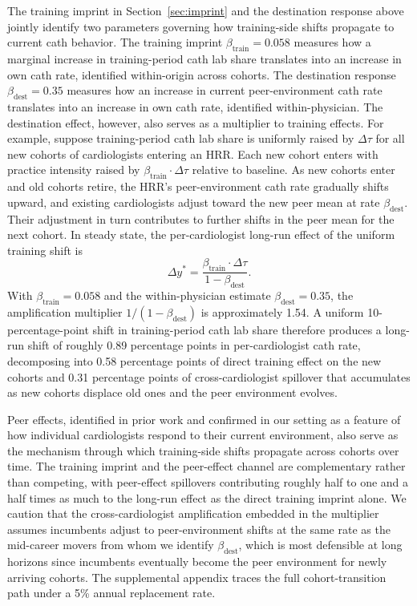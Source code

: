 \documentclass[12pt]{article}
\begin{document}
The training imprint in Section~\ref{sec:imprint} and the destination response above jointly identify two parameters governing how training-side shifts propagate to current cath behavior. The training imprint $\beta_{\text{train}} = 0.058$ measures how a marginal increase in training-period cath lab share translates into an increase in own cath rate, identified within-origin across cohorts. The destination response $\beta_{\text{dest}} = 0.35$ measures how an increase in current peer-environment cath rate translates into an increase in own cath rate, identified within-physician. The destination effect, however, also serves as a multiplier to training effects. For example, suppose training-period cath lab share is uniformly raised by $\Delta\tau$ for all new cohorts of cardiologists entering an HRR. Each new cohort enters with practice intensity raised by $\beta_{\text{train}} \cdot \Delta\tau$ relative to baseline. As new cohorts enter and old cohorts retire, the HRR's peer-environment cath rate gradually shifts upward, and existing cardiologists adjust toward the new peer mean at rate $\beta_{\text{dest}}$. Their adjustment in turn contributes to further shifts in the peer mean for the next cohort. In steady state, the per-cardiologist long-run effect of the uniform training shift is
\begin{equation}\label{eq:multiplier}
\Delta y^{*} = \frac{\beta_{\text{train}} \cdot \Delta\tau}{1 - \beta_{\text{dest}}}.
\end{equation}
With $\beta_{\text{train}} = 0.058$ and the within-physician estimate $\beta_{\text{dest}} = 0.35$, the amplification multiplier $1/(1 - \beta_{\text{dest}})$ is approximately 1.54. A uniform 10-percentage-point shift in training-period cath lab share therefore produces a long-run shift of roughly 0.89 percentage points in per-cardiologist cath rate, decomposing into 0.58 percentage points of direct training effect on the new cohorts and 0.31 percentage points of cross-cardiologist spillover that accumulates as new cohorts displace old ones and the peer environment evolves.

Peer effects, identified in prior work and confirmed in our setting as a feature of how individual cardiologists respond to their current environment, also serve as the mechanism through which training-side shifts propagate across cohorts over time. The training imprint and the peer-effect channel are complementary rather than competing, with peer-effect spillovers contributing roughly half to one and a half times as much to the long-run effect as the direct training imprint alone. We caution that the cross-cardiologist amplification embedded in the multiplier assumes incumbents adjust to peer-environment shifts at the same rate as the mid-career movers from whom we identify $\beta_{\text{dest}}$, which is most defensible at long horizons since incumbents eventually become the peer environment for newly arriving cohorts. The supplemental appendix traces the full cohort-transition path under a 5\% annual replacement rate.
\end{document}
